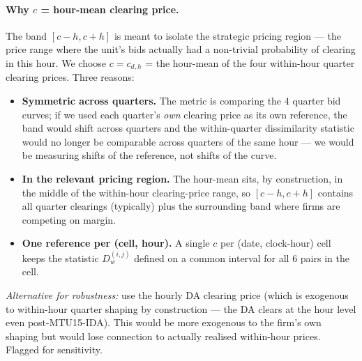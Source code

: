 \documentclass[11pt,a4paper]{article}
\begin{document}
\paragraph{Why $c$ = hour-mean clearing price.}
The band $[c-h, c+h]$ is meant to isolate the strategic pricing region --- the price range where the unit's bids actually had a non-trivial probability of clearing in this hour. We choose $c = c_{d,h}$ = the hour-mean of the four within-hour quarter clearing prices. Three reasons:
\begin{itemize}
\item \textbf{Symmetric across quarters.} The metric is comparing the 4 quarter bid curves; if we used each quarter's \emph{own} clearing price as its own reference, the band would shift across quarters and the within-quarter dissimilarity statistic would no longer be comparable across quarters of the same hour --- we would be measuring shifts of the reference, not shifts of the curve.
\item \textbf{In the relevant pricing region.} The hour-mean sits, by construction, in the middle of the within-hour clearing-price range, so $[c-h, c+h]$ contains all quarter clearings (typically) plus the surrounding band where firms are competing on margin.
\item \textbf{One reference per (cell, hour).} A single $c$ per (date, clock-hour) cell keeps the statistic $D_w^{(i,j)}$ defined on a common interval for all 6 pairs in the cell.
\end{itemize}
\emph{Alternative for robustness:} use the hourly DA clearing price (which is exogenous to within-hour quarter shaping by construction --- the DA clears at the hour level even post-MTU15-IDA). This would be more exogenous to the firm's own shaping but would lose connection to actually realised within-hour prices. Flagged for sensitivity.
\end{document}
